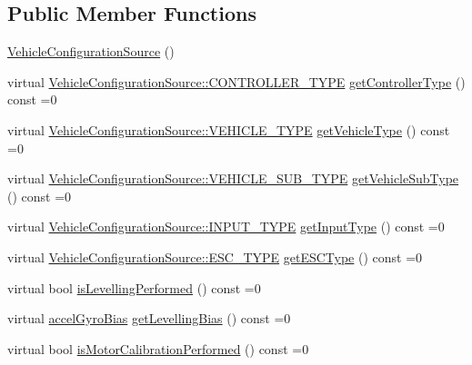 \subsection*{\-Public \-Member \-Functions}
\begin{DoxyCompactItemize}
\item 
\hyperlink{group___vehicle_configuration_source_ga56e48ed960f6d5fd24d03e01caaa460b}{\-Vehicle\-Configuration\-Source} ()
\item 
virtual \*
\hyperlink{group___vehicle_configuration_source_ga3cfce2b0a501a6fdb7a0ae408ba63556}{\-Vehicle\-Configuration\-Source\-::\-C\-O\-N\-T\-R\-O\-L\-L\-E\-R\-\_\-\-T\-Y\-P\-E} \hyperlink{group___vehicle_configuration_source_ga7c0552b72e10b1c4f84ffcb926f1bc87}{get\-Controller\-Type} () const =0
\item 
virtual \*
\hyperlink{group___vehicle_configuration_source_gaa97253587c69ba0d23535abdc42fad43}{\-Vehicle\-Configuration\-Source\-::\-V\-E\-H\-I\-C\-L\-E\-\_\-\-T\-Y\-P\-E} \hyperlink{group___vehicle_configuration_source_gacfd79047f8c186731eca58056dbb979d}{get\-Vehicle\-Type} () const =0
\item 
virtual \*
\hyperlink{group___vehicle_configuration_source_gaa22bfa88d750f2b46f66702a723e8342}{\-Vehicle\-Configuration\-Source\-::\-V\-E\-H\-I\-C\-L\-E\-\_\-\-S\-U\-B\-\_\-\-T\-Y\-P\-E} \hyperlink{group___vehicle_configuration_source_gab3c8f49e774f0b679b21f6f281b3b803}{get\-Vehicle\-Sub\-Type} () const =0
\item 
virtual \*
\hyperlink{group___vehicle_configuration_source_gae10edd59d3a32fad8c531a1d2346115c}{\-Vehicle\-Configuration\-Source\-::\-I\-N\-P\-U\-T\-\_\-\-T\-Y\-P\-E} \hyperlink{group___vehicle_configuration_source_gaa63bd09fcc8f30102f720cad79f99e7f}{get\-Input\-Type} () const =0
\item 
virtual \*
\hyperlink{group___vehicle_configuration_source_ga734c812e17554d4f7ca67f1008abdd6c}{\-Vehicle\-Configuration\-Source\-::\-E\-S\-C\-\_\-\-T\-Y\-P\-E} \hyperlink{group___vehicle_configuration_source_ga748ecf5409ded5e291f093a48cea7637}{get\-E\-S\-C\-Type} () const =0
\item 
virtual bool \hyperlink{group___vehicle_configuration_source_ga18b570857c0bc2d0e77ad0be0a324f37}{is\-Levelling\-Performed} () const =0
\item 
virtual \hyperlink{structaccel_gyro_bias}{accel\-Gyro\-Bias} \hyperlink{group___vehicle_configuration_source_gae596e5378b9bc9d126c6c6207f473567}{get\-Levelling\-Bias} () const =0
\item 
virtual bool \hyperlink{group___vehicle_configuration_source_gaf2d0f922c260a7bd4481d565f1b46589}{is\-Motor\-Calibration\-Performed} () const =0

\end{DoxyCompactItemize}
